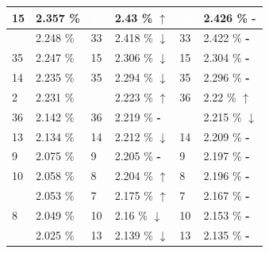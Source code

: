 \documentclass[letterpaper]{article}
\newcommand{\caseUp}[1][]{#1\textcolor[HTML]{008000}{$\mathbf{\uparrow}$}}
\newcommand{\caseStable}[1][]{#1\textcolor[HTML]{3779dd}{\textbf{-}}}
\newcommand{\caseDown}[1][]{#1\textcolor[HTML]{dd3737}{$\mathbf{\downarrow}$}}
\begin{document}
\begin{table}
\begin{tabular}{|l|l||l|l||l|l|}
	    \cellcolor[HTML]{FF69B4} 15 & 2.357 \% & \cellcolor[HTML]{483D8B} \textcolor{white}{40} & 2.43 \% \caseUp[\hfill] & \cellcolor[HTML]{483D8B} \textcolor{white}{40} & 2.426 \% \caseStable[\hfill] \\ \hline 
	    \cellcolor[HTML]{483D8B} \textcolor{white}{40} & 2.248 \% & \cellcolor[HTML]{2E8B57} 33 & 2.418 \% \caseDown[\hfill] & \cellcolor[HTML]{2E8B57} 33 & 2.422 \% \caseStable[\hfill] \\ \hline 
	    \cellcolor[HTML]{2E8B57} 35 & 2.247 \% & \cellcolor[HTML]{FF69B4} 15 & 2.306 \% \caseDown[\hfill] & \cellcolor[HTML]{FF69B4} 15 & 2.304 \% \caseStable[\hfill] \\ \hline 
	    \cellcolor[HTML]{FF69B4} 14 & 2.235 \% & \cellcolor[HTML]{2E8B57} 35 & 2.294 \% \caseDown[\hfill] & \cellcolor[HTML]{2E8B57} 35 & 2.296 \% \caseStable[\hfill] \\ \hline 
	    \cellcolor[HTML]{A0522D}  2 & 2.231 \% & \cellcolor[HTML]{8B1A1A} \textcolor{white}{5} & 2.223 \% \caseUp[\hfill] & \cellcolor[HTML]{E6E6FA} 36 & 2.22 \% \caseUp[\hfill] \\ \hline 
	    \cellcolor[HTML]{E6E6FA} 36 & 2.142 \% & \cellcolor[HTML]{E6E6FA} 36 & 2.219 \% \caseStable[\hfill] & \cellcolor[HTML]{8B1A1A} \textcolor{white}{5} & 2.215 \% \caseDown[\hfill] \\ \hline 
	    \cellcolor[HTML]{FFFFF0} 13 & 2.134 \% & \cellcolor[HTML]{FF69B4} 14 & 2.212 \% \caseDown[\hfill] & \cellcolor[HTML]{FF69B4} 14 & 2.209 \% \caseStable[\hfill] \\ \hline 
	    \cellcolor[HTML]{1E90FF}  9 & 2.075 \% & \cellcolor[HTML]{1E90FF}  9 & 2.205 \% \caseStable[\hfill] & \cellcolor[HTML]{1E90FF} 9 & 2.197 \% \caseStable[\hfill] \\ \hline 
	    \cellcolor[HTML]{1E90FF} 10 & 2.058 \% & \cellcolor[HTML]{FFC1C1}  8 & 2.204 \% \caseUp[\hfill] & \cellcolor[HTML]{FFC1C1} 8 & 2.196 \% \caseStable[\hfill] \\ \hline 
	    \cellcolor[HTML]{000000} \textcolor{white}{11} & 2.053 \% & \cellcolor[HTML]{1E90FF}  7 & 2.175 \% \caseUp[\hfill] & \cellcolor[HTML]{1E90FF} 7 & 2.167 \% \caseStable[\hfill] \\ \hline 
	    \cellcolor[HTML]{FFC1C1}  8 & 2.049 \% & \cellcolor[HTML]{1E90FF} 10 & 2.16 \% \caseDown[\hfill] & \cellcolor[HTML]{1E90FF} 10 & 2.153 \% \caseStable[\hfill] \\ \hline 
	    \cellcolor[HTML]{8B1A1A}  \textcolor{white}{5} & 2.025 \% & \cellcolor[HTML]{FFFFF0} 13 & 2.139 \% \caseDown[\hfill] & \cellcolor[HTML]{FFFFF0} 13 & 2.135 \% \caseStable[\hfill] \\ \hline 

\end{tabular}
\end{table}
\end{document}
